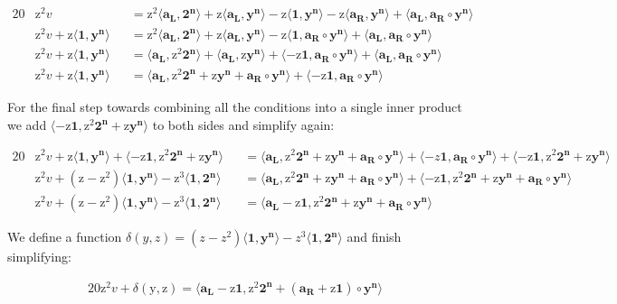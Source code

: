\documentclass{article}
\newcommand{\eq}[1]{\begin{alignat*}{20}#1\end{alignat*}}
\renewcommand{\vec}[1]{\boldsymbol{#1}}
\newcommand{\ran}[1]{\mathrm{#1}}
\newcommand{\vecran}[1]{\mathbf{#1}}
\newcommand{\dotp}[2]{\langle #1, #2 \rangle}
\newcommand{\opn}[1]{\operatorname{#1}}
\newcommand{\vecl}[1]{\vec{#1_{\opn{L}}}}
\newcommand{\vecr}[1]{\vec{#1_{\opn{R}}}}
\begin{document}
\eq{	
	&\ran{z^2}v &&= 
	\ran{z^2}\dotp{\vecl{a}}{\vec{2^n}} +
	\ran{z}\dotp{\vecl{a}}{\vecran{y^n}} -
	\ran{z}\dotp{\vec{1}}{\vecran{y^n}} -
	\ran{z}\dotp{\vecr{a}}{\vecran{y^n}} +
	\dotp{\vecl{a}}{\vecr{a}\circ \vecran{y^n}} \\
	&\ran{z^2}v + \ran{z}\dotp{\vec{1}}{\vecran{y^n}} 
	&&= \ran{z^2}\dotp{\vecl{a}}{\vec{2^n}} +
	\ran{z}\dotp{\vecl{a}}{\vecran{y^n}} -
	\ran{z}\dotp{\vec{1}}{\vecr{a}\circ\vecran{y^n}} +
	\dotp{\vecl{a}}{\vecr{a}\circ \vecran{y^n}} \\
	&\ran{z^2}v + \ran{z}\dotp{\vec{1}}{\vecran{y^n}} 
	&&= \dotp{\vecl{a}}{\ran{z^2}\vec{2^n}} +
	\dotp{\vecl{a}}{\ran{z}\vecran{y^n}} +
	\dotp{-\ran{z}\vec{1}}{\vecr{a}\circ\vecran{y^n}} +
	\dotp{\vecl{a}}{\vecr{a}\circ \vecran{y^n}} \\
	&\ran{z^2}v + \ran{z}\dotp{\vec{1}}{\vecran{y^n}} 
	&&= \dotp{\vecl{a}}{\ran{z^2}\vec{2^n} + \ran{z}\vecran{y^n} + \vecr{a}\circ \vecran{y^n}} +
	\dotp{-\ran{z}\vec{1}}{\vecr{a}\circ\vecran{y^n}}
}

For the final step towards combining all the conditions into a single
inner product we add $\dotp{-\ran{z}\vec{1}}{\ran{z^2}\vec{2^n} +
\ran{z}\vecran{y^n}}$ to both sides and simplify again:

\eq{
	&\ran{z^2}v + \ran{z}\dotp{\vec{1}}{\vecran{y^n}} + \dotp{-\ran{z}\vec{1}}{\ran{z^2}\vec{2^n} + \ran{z}\vecran{y^n}}
	&&= \dotp{\vecl{a}}{\ran{z^2}\vec{2^n} + \ran{z}\vecran{y^n} + \vecr{a}\circ \vecran{y^n}} +
	\dotp{-z\vec{1}}{\vecr{a}\circ\vecran{y^n}} + \dotp{-\ran{z}\vec{1}}{\ran{z^2}\vec{2^n} + \ran{z}\vecran{y^n}} \\ 
	&\ran{z^2}v + (\ran{z} - \ran{z^2})\dotp{\vec{1}}{\vecran{y^n}} - \ran{z^3}\dotp{\vec{1}}{\vec{2^n}} &&= \dotp{\vecl{a}}{\ran{z^2}\vec{2^n} + \ran{z}\vecran{y^n} + \vecr{a}\circ \vecran{y^n}} + \dotp{-\ran{z}\vec{1}}{\ran{z^2}\vec{2^n}+\ran{z}\vecran{y^n} + \vecr{a}\circ\vecran{y^n}}
	\\
	&\ran{z^2}v + (\ran{z} - \ran{z^2})\dotp{\vec{1}}{\vecran{y^n}} - \ran{z^3}\dotp{\vec{1}}{\vec{2^n}} &&= \dotp{\vecl{a}- \ran{z}\vec{1}}{\ran{z^2}\vec{2^n} + \ran{z}\vecran{y^n} + \vecr{a}\circ \vecran{y^n}}
}

We define a function $\delta(y,z) = (z - z^2)\dotp{\vec{1}}{\vec{y^n}}
- z^3\dotp{\vec{1}}{\vec{2^n}}$ and finish simplifying:

\eq{
	\ran{z^2}v + \delta(\ran{y},\ran{z}) = \dotp{\vecl{a} - \ran{z}\vec{1}}{\ran{z^2}\vec{2^n} + (\vecr{a} + \ran{z}\vec{1})\circ\vecran{y^n}}
}
\end{document}
